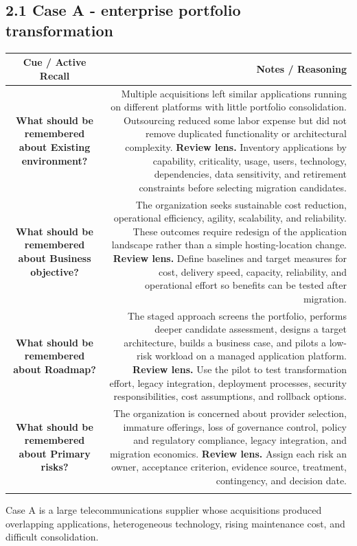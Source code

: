 \documentclass[11pt]{article}
\newcommand{\CornellHeader}{\rowcolor{Navy}\color{white}\bfseries Cue / Active Recall & \color{white}\bfseries Notes / Reasoning \\\endhead}
\newcommand{\CornellRow}[2]{\cellcolor{CueGray}\textbf{#1} & #2 \\\addlinespace[3pt]}
\begin{document}
\subsection{2.1 Case A - enterprise portfolio transformation}
\begin{longtable}{@{}C N@{}}
\CornellHeader
\CornellRow{What should be remembered about Existing environment?}{Multiple acquisitions left similar applications running on different platforms with little portfolio consolidation. Outsourcing reduced some labor expense but did not remove duplicated functionality or architectural complexity. \textbf{Review lens.} Inventory applications by capability, criticality, usage, users, technology, dependencies, data sensitivity, and retirement constraints before selecting migration candidates.}
\CornellRow{What should be remembered about Business objective?}{The organization seeks sustainable cost reduction, operational efficiency, agility, scalability, and reliability. These outcomes require redesign of the application landscape rather than a simple hosting-location change. \textbf{Review lens.} Define baselines and target measures for cost, delivery speed, capacity, reliability, and operational effort so benefits can be tested after migration.}
\CornellRow{What should be remembered about Roadmap?}{The staged approach screens the portfolio, performs deeper candidate assessment, designs a target architecture, builds a business case, and pilots a low-risk workload on a managed application platform. \textbf{Review lens.} Use the pilot to test transformation effort, legacy integration, deployment processes, security responsibilities, cost assumptions, and rollback options.}
\CornellRow{What should be remembered about Primary risks?}{The organization is concerned about provider selection, immature offerings, loss of governance control, policy and regulatory compliance, legacy integration, and migration economics. \textbf{Review lens.} Assign each risk an owner, acceptance criterion, evidence source, treatment, contingency, and decision date.}
\end{longtable}
\begin{sectionsummarybox}
Case A is a large telecommunications supplier whose acquisitions produced overlapping applications, heterogeneous technology, rising maintenance cost, and difficult consolidation.
\end{sectionsummarybox}
\end{document}
